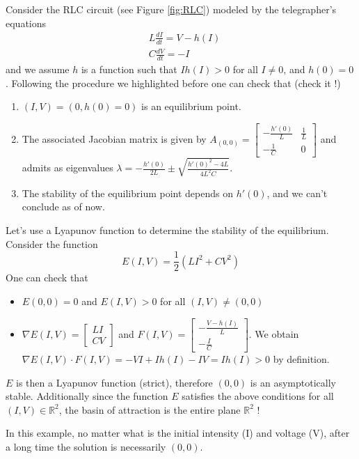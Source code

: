 \begin{Example}
Consider the RLC circuit (see Figure \ref{fig:RLC}) modeled by the telegrapher's equations
\[ 
 \begin{aligned}
&\displaystyle L \frac{d I}{d t} =  V - h(I)  \\ 
&\displaystyle  C\frac{d V}{d t } = - I
\end{aligned}
\]
and we assume $h$ is a function such that $Ih(I) >0$ for all $I \neq 0$, and $h(0) = 0$. Following the procedure we highlighted before one can check that (check it !)
\begin{enumerate}
\item  $(I,V) = (0, h(0) = 0)$ is an equilibrium point.
\item The associated Jacobian matrix is given by $A_{ (0, 0)} = \begin{bmatrix}
 - \frac{h'(0)}{L} & \frac{1}{L} \\ - \frac{1}{C} & 0
\end{bmatrix} $ and admits as eigenvalues $\lambda = - \frac{h'(0)}{2L}\pm  \sqrt{\frac{h'(0)^2 - 4 L}{4 L^2 C}} $.
\item The stability of the equilibrium point depends on $h'(0)$, and we can't conclude as of now.
\end{enumerate}
Let's use a Lyapunov function to determine the stability of the equilibrium. Consider the function
\[E(I,V) = \frac{1}{2} (LI^2 + CV^2)\]
One can check that
\begin{itemize}
\item $E(0,0) = 0$ and $E(I,V) >0 $ for all $(I,V) \neq (0,0)$
\item  $\nabla E (I,V) = \begin{bmatrix}
 L I \\ CV
\end{bmatrix} $ and $F(I,V) = \begin{bmatrix}
-\frac{V - h(I)}{L} \\ - \frac{I}{C}
\end{bmatrix} $. We obtain $ \nabla E (I,V) \cdot F(I,V)  = - VI + I h(I) - IV = I h(I) >0$ by definition.
\end{itemize}
$E$ is then a Lyapunov function (strict), therefore $(0,0)$ is an asymptotically stable. Additionally since the function $E$ satisfies the above conditions for all $(I,V)\in \mathbb{R}^2$, the basin of attraction is the entire plane $\mathbb{R}^2$ !

In this example, no matter what is the initial intensity (I) and voltage (V), after a long time the solution is necessarily $(0,0)$. 
\end{Example}
